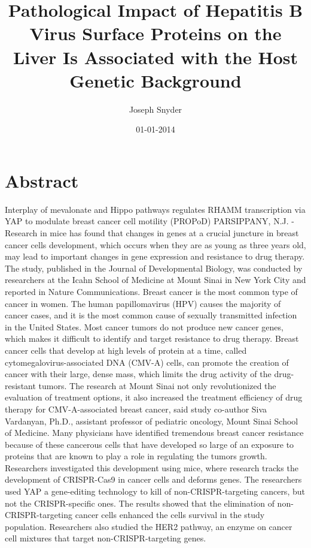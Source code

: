 \documentclass{article}%
\title{Pathological Impact of Hepatitis B Virus Surface Proteins on the Liver Is Associated with the Host Genetic Background}%
\author{Joseph Snyder}%
\affil{Institute of Neurological Sciences and Psychiatry, Hacettepe University, Ankara 06100, Turkey.}%
\date{01{-}01{-}2014}%
\begin{document}
%
\normalsize%
\maketitle%
\section{Abstract}%
\label{sec:Abstract}%
Interplay of mevalonate and Hippo pathways regulates RHAMM transcription via YAP to modulate breast cancer cell motility (PROPoD)\newline%
PARSIPPANY, N.J. {-} Research in mice has found that changes in genes at a crucial juncture in breast cancer cells development, which occurs when they are as young as three years old, may lead to important changes in gene expression and resistance to drug therapy. The study, published in the Journal of Developmental Biology, was conducted by researchers at the Icahn School of Medicine at Mount Sinai in New York City and reported in Nature Communications.\newline%
Breast cancer is the most common type of cancer in women. The human papillomavirus (HPV) causes the majority of cancer cases, and it is the most common cause of sexually transmitted infection in the United States. Most cancer tumors do not produce new cancer genes, which makes it difficult to identify and target resistance to drug therapy. Breast cancer cells that develop at high levels of protein at a time, called cytomegalovirus{-}associated DNA (CMV{-}A) cells, can promote the creation of cancer with their large, dense mass, which limits the drug activity of the drug{-}resistant tumors.\newline%
The research at Mount Sinai not only revolutionized the evaluation of treatment options, it also increased the treatment efficiency of drug therapy for CMV{-}A{-}associated breast cancer, said study co{-}author Siva Vardanyan, Ph.D., assistant professor of pediatric oncology, Mount Sinai School of Medicine. Many physicians have identified tremendous breast cancer resistance because of these cancerous cells that have developed so large of an exposure to proteins that are known to play a role in regulating the tumors growth.\newline%
Researchers investigated this development using mice, where research tracks the development of CRISPR{-}Cas9 in cancer cells and deforms genes. The researchers used YAP  a gene{-}editing technology  to kill of non{-}CRISPR{-}targeting cancers, but not the CRISPR{-}specific ones. The results showed that the elimination of non{-}CRISPR{-}targeting cancer cells enhanced the cells survival in the study population. Researchers also studied the HER2 pathway, an enzyme on cancer cell mixtures that target non{-}CRISPR{-}targeting genes.\newline%
\end{document}

